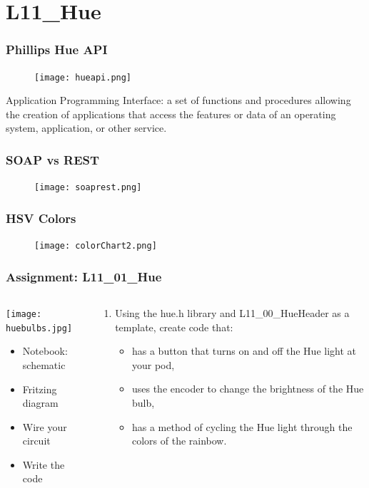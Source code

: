 \documentclass{beamer}
\begin{document}
\section{L11\_Hue}

\begin{frame}\frametitle{Phillips Hue API}
\begin{figure}[h]
	\texttt{[image: hueapi.png]}
\end{figure}
Application Programming Interface: a set of functions and procedures allowing the creation of applications that access the features or data of an operating system, application, or other service.
\end{frame}

\begin{frame}\frametitle{SOAP vs REST}
\begin{figure}[h]
	\texttt{[image: soaprest.png]}
\end{figure}
\end{frame}

\begin{frame}\frametitle{HSV Colors}
\begin{figure}[h]
	\texttt{[image: colorChart2.png]}
\end{figure}
\end{frame}

\begin{frame}\frametitle{Assignment: L11\_01\_Hue}
\begin{columns}
\begin{column}{4.5cm}
\begin{center}
\texttt{[image: huebulbs.jpg]}
\end{center}
\begin{itemize}
\item Notebook: schematic
\item Fritzing diagram
\item Wire your circuit
\item Write the code
\end{itemize}
\end{column}
\begin{column}{6.5cm}
\begin{enumerate}
\item Using the hue.h library and L11\_00\_HueHeader as a template, create code that:
	\begin{itemize}
	\item has a button that turns on and off the Hue light at your pod,
	\item uses the encoder to change the brightness of the Hue bulb,
	\item has a method of cycling the Hue light through the colors of the rainbow.
	\end{itemize}	
\end{enumerate}
\end{column}
\end{columns}
\end{frame}
\end{document}
